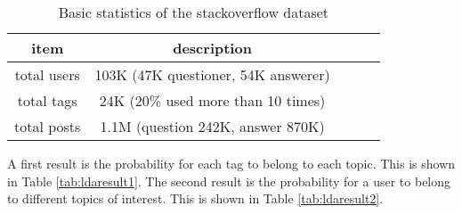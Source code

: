 \begin{table}[htp]
\caption{Basic statistics of the stackoverflow dataset}
\label{tab:stackoverflowdata}
\centering
\begin{tabular}{|c|c|c|c|c|}
\hline
\textbf{item} & \textbf{description} \\
\hline
total users & 103K (47K questioner, 54K answerer)\\
\hline
total tags & 24K (20\% used more than 10 times)\\
\hline
total posts & 1.1M (question 242K, answer 870K) \\
\hline
\end{tabular}
\end{table}




A first result is the probability for each tag to belong to each topic. This is  shown in Table \ref{tab:ldaresult1}. 
The second result is the probability for a user to belong to different topics of interest. This is shown in Table \ref{tab:ldaresult2}. 


